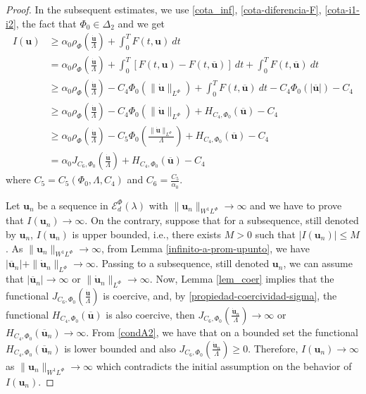 \documentclass[twoside]{article}
\theoremstyle{remark}
\newcommand{\orlnor}{\|_{L^{\Phi}}}
\newcommand{\lphi}{L^{\Phi}}
\newcommand{\sobnor}{\|_{W^{1}\lphi}}
\newcommand{\domi}{\mathcal{E}^{\Phi}_d(\lambda)}
\renewcommand{\b}[1]{\boldsymbol{#1}}
\renewcommand{\leq}{\leqslant}
\renewcommand{\geq}{\geqslant}
\begin{document}
\begin{proof}
In the subsequent estimates, we use  \eqref{cota_inf}, \eqref{cota-diferencia-F},
\eqref{cota-i1-i2}, the fact that $\Phi_0 \in \Delta_2$ and we get
\begin{equation}\label{cota_inf_I}
\begin{split}
I(\b{u})&\geq\alpha_0\rho_{\Phi}\left( \frac{\b{\dot{u}}}{\Lambda}\right)+\int_0^TF(t,\b{u})\ dt
\\ 
&=\alpha_0\rho_{\Phi}\left( \frac{\b{\dot{u}}}{\Lambda}\right)+ \int_0^T \left[F(t,\b{u})-F(t,\b{\overline{u}})\right]\ dt 
+  \int_0^TF(t,\b{\overline{u}})\ dt
\\
&\geq \alpha_0\rho_{\Phi}\left( \frac{\b{\dot{u}}}{\Lambda}\right)
-C_4 \Phi_0(\|\b{\dot u}\orlnor)
+\int_0^TF(t,\b{\overline{u}})\ dt-
C_4 \Phi_0(|\b{\overline{u}}|)-
C_4 
\\
&\geq
\alpha_0\rho_{\Phi}\left( \frac{\b{\dot{u}}}{\Lambda}\right)
-C_4 \Phi_0(\|\b{\dot u}\orlnor)
+H_{C_4, \Phi_0}(\b{\overline{u}})
-C_4 
\\&\geq
\alpha_0\rho_{\Phi}\left( \frac{\b{\dot{u}}}{\Lambda}\right)
-C_5 \Phi_0\left(\frac{\|\b{\dot u}\orlnor}{\Lambda} \right)
+H_{C_4, \Phi_0}(\b{\overline{u}})
-C_4 
\\&=
\alpha_0J_{C_6,\Phi_0}\left(\frac{\b{\dot u}}{\Lambda}\right)
+H_{C_4, \Phi_0}(\b{\overline{u}})
-C_4 
\end{split}
\end{equation}
where $C_5=C_5(\Phi_0,\Lambda,C_4)$ and $C_6=\frac{C_5}{\alpha_0}$.



Let $\b{u}_n$ be  a sequence in $\domi$ with 
$\|\b{u}_n\sobnor\to\infty$ and we have to prove that $I(\b{u}_n)\to\infty$. 
On the contrary, suppose  that for a subsequence, 
still denoted by $\b{u}_n$, $I(\b{u}_n)$ is upper bounded, i.e., there exists $M>0$ such that $|I(\b{u}_{n})|\leq M$. 
As $\|\b{u}_n\sobnor\to\infty$, from Lemma \ref{infinito-a-prom-upunto},  we have $|\overline{\b{u}}_n|+\|\b{\dot{u}}_n\orlnor\to \infty$. Passing to a subsequence, still denoted $\b{u}_n$, we can assume that $|\b{\overline u}_n|\to \infty$ or $\|\b{\dot{u}}_n\orlnor\to \infty$.
Now, Lemma \ref{lem_coer} implies that the functional $J_{C_6,\Phi_0}(\frac{\b{\dot u}}{\Lambda})$ is coercive,
and, by \eqref{propiedad-coercividad-sigma},
the functional $H_{C_4,\Phi_0}(\b{\overline{u}})$ is also coercive, then 
$J_{C_6,\Phi_0}(\frac{\b{\dot u}_n}{\Lambda}) \to \infty$ or $H_{C_4,\Phi_0}(\b{\overline{u}}_n)\to \infty$.
From \eqref{condA2}, we have that on a bounded set the functional $H_{C_4,\Phi_0}(\b{\overline{u}}_n)$ is lower bounded and also $J_{C_6,\Phi_0}(\frac{\b{\dot u}_n}{\Lambda})\geq 0$. 
Therefore,  $I(\b{u}_n)\to\infty$ as $\|\b{u}_n\sobnor\to\infty$ which contradicts the initial assumption on the behavior of $I(\b{u}_n)$. 
\end{proof}
\end{document}

